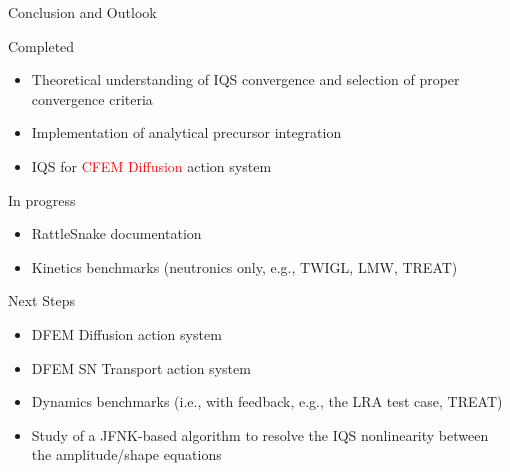 \documentclass[8pt]{beamer}
\newcommand{\bi}{\begin{itemize}}
\newcommand{\ei}{\end{itemize}}
\newcommand{\tcr}[1]{\textcolor{red}{#1}}
\begin{document}
\begin{frame}{Conclusion and Outlook}

\begin{block}{Completed}
\bi
\item Theoretical understanding of IQS convergence and selection of proper convergence criteria
\item Implementation of analytical precursor integration
\item IQS for \tcr{CFEM Diffusion} action system
\ei
\end{block}

\begin{block}{In progress}
\bi
\item RattleSnake documentation
\item Kinetics benchmarks (neutronics only, e.g., TWIGL, LMW, TREAT)
\ei
\end{block}
\begin{block}{Next Steps}
\bi
\item DFEM Diffusion action system
\item DFEM SN Transport action system
\item Dynamics benchmarks (i.e., with feedback, e.g., the LRA test case, TREAT)
\item Study of a JFNK-based algorithm to resolve the IQS nonlinearity between the amplitude/shape equations
\ei
\end{block}

\end{frame}
\end{document}
